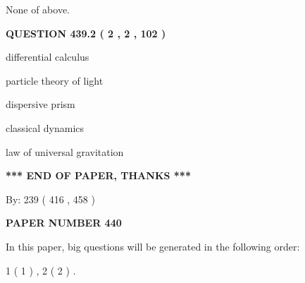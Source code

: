 \documentclass[12pt]{article}
\begin{document}
 
\noindent{}
 
 
 None of above.
 
 
 
 
  
\vspace{0.2in}
  
{\textbf{\Large{QUESTION
439.2 
 ( 2 , 2 , 102 )
}}}
  
  
 
 
\noindent{}
 
 
differential calculus
 
 
particle theory of light
 
 
dispersive prism
 
 
classical dynamics
 
 
law of universal gravitation
 
 
 
 
   
   
\vspace{1.0in} 
{\textbf{\large{ *** END OF PAPER, THANKS *** }}} 
   
   
\hspace{1.0in} By: 
 239 ( 416 ,  458 )
   
   
   
   
\newpage 
\setcounter{page}{ 
   440001 } 
   
   
   
   
 {\textbf{ \Large{ PAPER NUMBER  440  }}}
   
   
\vspace{0.2in}
   
   
   
   
   
\vspace{0.2in}
   
In this paper, big questions will be generated in the following order: 
   
   
   1 ( 1 )
 ,
   2 ( 2 )
 .
  
\vspace{0.2in}
  
\end{document}
